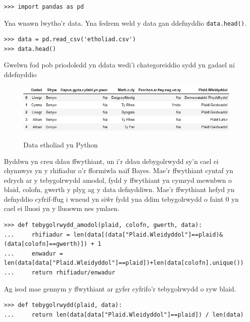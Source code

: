 \begin{verbatim}
>>> import pandas as pd
\end{verbatim}

Yna wnawn lwytho'r data. Yna fedrem weld y data gan ddefnyddio \texttt{data.head()}.

\begin{verbatim}
>>> data = pd.read_csv('etholiad.csv')
>>> data.head()
\end{verbatim}

Gwelwn fod pob priodoledd yn ddata wedi'i chategoreiddio sydd yn gadael ni ddefnyddio 

\begin{figure}[H]
\begin{center}
\includegraphics[width=0.8\linewidth]{../img/data_dosbarthiad_python.jpg}
\label{fig:data_dosbarthiad_python}
\caption{Data etholiad yn Python}
\end{center}
\end{figure}

Byddwn yn creu ddau ffwythiant, un i'r ddau debygolrwydd sy'n cael ei chynnwys yn y rhifiadur o'r fformiwla na\"{i}f Bayes. Mae'r ffwythiant cyntaf yn edrych ar y tebygolrwydd amodol, fydd y ffwythiant yn cymryd mewnbwn o blaid, colofn, gwerth y plyg ag y data defnyddiwn. Mae'r ffwythiant hefyd yn defnyddio cyfrif-ffug i wneud yn si\^{w}r fydd yna ddim tebygolrwydd o faint $0$ yn cael ei lluosi yn y lluoswm nes ymlaen.

\begin{verbatim}
>>> def tebygolrwydd_amodol(plaid, colofn, gwerth, data):
...     rhifiadur = len(data[(data["Plaid.Wleidyddol"]==plaid)&(data[colofn]==gwerth)]) + 1
...     enwadur = len(data[data["Plaid.Wleidyddol"]==plaid])+len(data[colofn].unique())
...     return rhifiadur/enwadur
\end{verbatim}

Ag isod mae gennym y ffwythiant ar gyfer cyfrifo'r tebygolrwydd o ryw blaid. 

\begin{verbatim}
>>> def tebygolrwydd(plaid, data):
...     return len(data[data["Plaid.Wleidyddol"]==plaid]) / len(data)
\end{verbatim}

